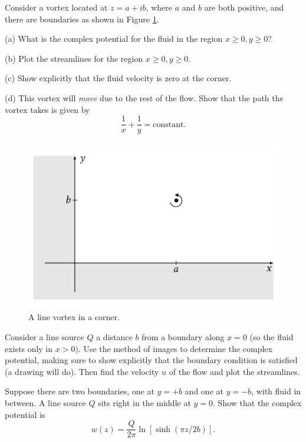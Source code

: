 \begin{problem}
Consider a vortex located at $z = a + ib$, where $a$ and $b$ are both positive, and there are boundaries as shown in Figure \ref{fig_vortex_corner}.  

(a) What is the complex potential for the fluid in the region $x \ge 0, y \ge 0$?

(b) Plot the streamlines for the region $x \ge 0, y \ge 0$.

(c) Show explicitly that the fluid velocity is zero at the corner.

(d) This vortex will \emph{move} due to the rest of the flow.  Show that the path the vortex takes is given by
\[
\frac{1}{x} + \frac{1}{y} = \text{constant}.
\]
\end{problem}

\begin{figure}
\centering\includegraphics[width=0.75\linewidth]{Figures/Chapter4/fig_vortex_corner}
\caption{A line vortex in a corner.}
\label{fig_vortex_corner}
\end{figure}

\begin{problem}
Consider a line source $Q$ a distance $b$ from a boundary along $x = 0$ (so the fluid exists only in $x>0$).  Use the method of images to determine the complex potential, making sure to show explicitly that the boundary condition is satisfied (a drawing will do).  Then find the velocity $u$ of the flow and plot the streamlines.
\end{problem}

\begin{problem}
Suppose there are two boundaries, one at $y = +b$ and one at $y = -b$, with fluid in between.  A line source $Q$ sits right in the middle at $y = 0$.  Show that the complex potential is
\[
w(z) = \frac{Q}{2\pi} \ln \left[ \sinh \left( \pi z / 2b \right) \right].
\]
\end{problem}

